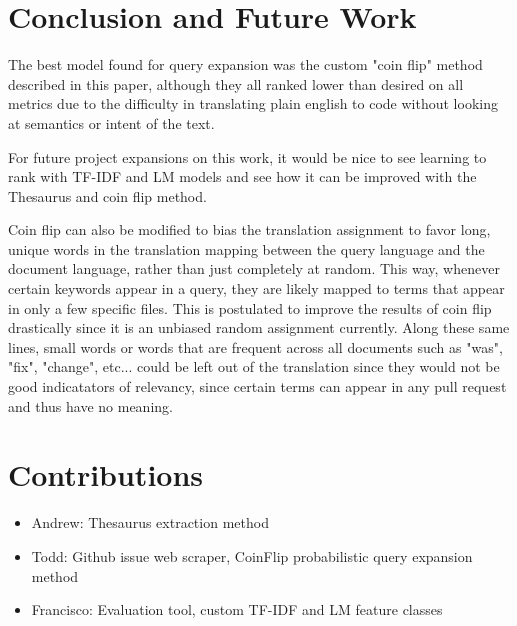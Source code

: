 \documentclass[10pt,a4paper]{article}
\begin{document}
\section{Conclusion and Future Work}

The best model found for query expansion was the custom "coin flip" method described in
this paper, although they all ranked lower than desired on all metrics due to the difficulty
in translating plain english to code without looking at semantics or intent of the text.

For future project expansions on this work, it would be nice to see learning to
rank with TF-IDF and LM models and see how it can be improved with the Thesaurus
and coin flip method.

Coin flip can also be modified to bias the translation assignment to favor
long, unique words in the translation mapping between the query language and the
document language, rather than just completely at random. This way, whenever
certain keywords appear in a query, they are likely mapped to terms that appear
in only a few specific files. This is postulated to improve the results of coin
flip drastically since it is an unbiased random assignment currently. Along
these same lines, small words or words that are frequent across all documents
such as "was", "fix", "change", etc... could be left out of the translation
since they would not be good indicatators of relevancy, since certain terms can
appear in any pull request and thus have no meaning.

\section{Contributions}

\begin{itemize}
  \item Andrew: Thesaurus extraction method
  \item Todd: Github issue web scraper, CoinFlip probabilistic query expansion method
  \item Francisco: Evaluation tool, custom TF-IDF and LM feature classes
\end{itemize}
\end{document}
